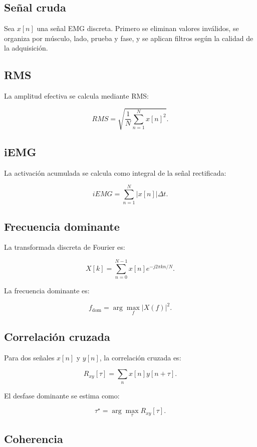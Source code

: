 \documentclass[12pt,a4paper]{article}
\begin{document}
\subsection{Señal cruda}

Sea \(x[n]\) una señal EMG discreta. Primero se eliminan valores inválidos, se organiza por músculo, lado, prueba y fase, y se aplican filtros según la calidad de la adquisición.

\subsection{RMS}

La amplitud efectiva se calcula mediante RMS:

\[
RMS =
\sqrt{
\frac{1}{N}
\sum_{n=1}^{N}
x[n]^2
}.
\]

\subsection{iEMG}

La activación acumulada se calcula como integral de la señal rectificada:

\[
iEMG =
\sum_{n=1}^{N}
|x[n]|\Delta t.
\]

\subsection{Frecuencia dominante}

La transformada discreta de Fourier es:

\[
X[k]=
\sum_{n=0}^{N-1}
x[n]e^{-j2\pi kn/N}.
\]

La frecuencia dominante es:

\[
f_{\text{dom}}
=
\arg\max_f |X(f)|^2.
\]

\subsection{Correlación cruzada}

Para dos señales \(x[n]\) y \(y[n]\), la correlación cruzada es:

\[
R_{xy}[\tau]
=
\sum_n x[n]y[n+\tau].
\]

El desfase dominante se estima como:

\[
\tau^\star =
\arg\max_\tau R_{xy}[\tau].
\]

\subsection{Coherencia}
\end{document}
